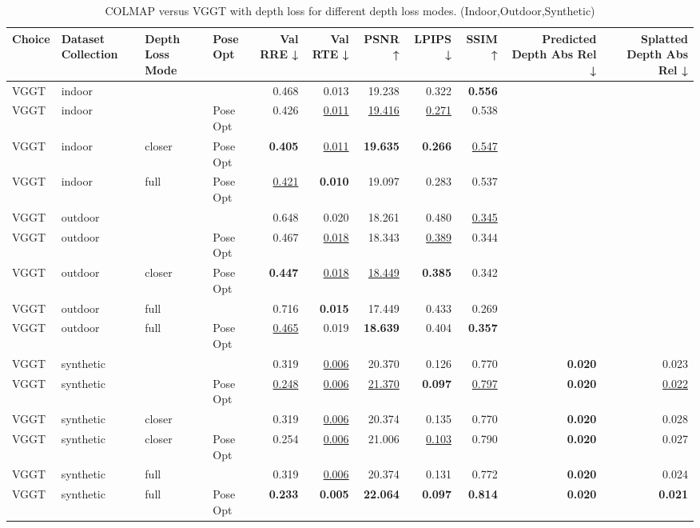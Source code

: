 \begin{table}[H]
\caption{\ifdefined\customcaption \customcaption \else COLMAP versus VGGT with depth loss for different depth loss modes. (Indoor,Outdoor,Synthetic) \fi}
\label{tab:05_depth_loss_mode_pose_opt_indoor,outdoor,synthetic}
\centering
\scriptsize
\begin{tabular}{llllrrrrrrr}
\toprule
Choice & Dataset Collection & Depth Loss Mode & Pose Opt & Val RRE ↓ & Val RTE ↓ & PSNR ↑ & LPIPS ↓ & SSIM ↑ & Predicted Depth Abs Rel ↓ & Splatted Depth Abs Rel ↓ \\
\midrule
VGGT & indoor &  &  & 0.468 & 0.013 & 19.238 & 0.322 & \textbf{0.556} &  &  \\
VGGT & indoor &  & Pose Opt & 0.426 & \underline{0.011} & \underline{19.416} & \underline{0.271} & 0.538 &  &  \\
VGGT & indoor & closer & Pose Opt & \textbf{0.405} & \underline{0.011} & \textbf{19.635} & \textbf{0.266} & \underline{0.547} &  &  \\
VGGT & indoor & full & Pose Opt & \underline{0.421} & \textbf{0.010} & 19.097 & 0.283 & 0.537 &  &  \\
\midrule
VGGT & outdoor &  &  & 0.648 & 0.020 & 18.261 & 0.480 & \underline{0.345} &  &  \\
VGGT & outdoor &  & Pose Opt & 0.467 & \underline{0.018} & 18.343 & \underline{0.389} & 0.344 &  &  \\
VGGT & outdoor & closer & Pose Opt & \textbf{0.447} & \underline{0.018} & \underline{18.449} & \textbf{0.385} & 0.342 &  &  \\
VGGT & outdoor & full &  & 0.716 & \textbf{0.015} & 17.449 & 0.433 & 0.269 &  &  \\
VGGT & outdoor & full & Pose Opt & \underline{0.465} & 0.019 & \textbf{18.639} & 0.404 & \textbf{0.357} &  &  \\
\midrule
VGGT & synthetic &  &  & 0.319 & \underline{0.006} & 20.370 & 0.126 & 0.770 & \textbf{0.020} & 0.023 \\
VGGT & synthetic &  & Pose Opt & \underline{0.248} & \underline{0.006} & \underline{21.370} & \textbf{0.097} & \underline{0.797} & \textbf{0.020} & \underline{0.022} \\
VGGT & synthetic & closer &  & 0.319 & \underline{0.006} & 20.374 & 0.135 & 0.770 & \textbf{0.020} & 0.028 \\
VGGT & synthetic & closer & Pose Opt & 0.254 & \underline{0.006} & 21.006 & \underline{0.103} & 0.790 & \textbf{0.020} & 0.027 \\
VGGT & synthetic & full &  & 0.319 & \underline{0.006} & 20.374 & 0.131 & 0.772 & \textbf{0.020} & 0.024 \\
VGGT & synthetic & full & Pose Opt & \textbf{0.233} & \textbf{0.005} & \textbf{22.064} & \textbf{0.097} & \textbf{0.814} & \textbf{0.020} & \textbf{0.021} \\
\bottomrule
\end{tabular}
\end{table}